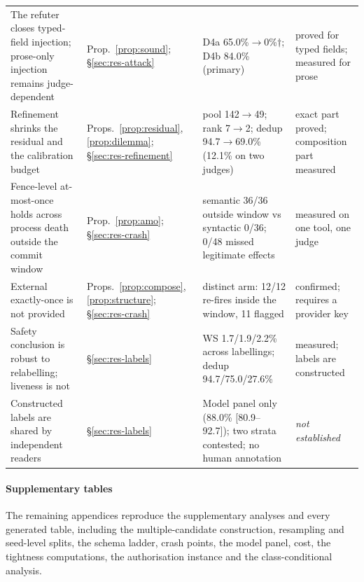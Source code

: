 \begin{table}[!tbp]
\begin{tabularx}{\linewidth}{@{}p{2.8cm}p{2.3cm}Xp{2.7cm}@{}}
The refuter closes typed-field injection; prose-only injection remains judge-dependent & Prop.~\ref{prop:sound}; §\ref{sec:res-attack} & D4a 65.0\%$\to$0\%$\dagger$; D4b 84.0\% (primary) & proved for typed fields; measured for prose \\
Refinement shrinks the residual and the calibration budget & Props.~\ref{prop:residual}, \ref{prop:dilemma}; §\ref{sec:res-refinement} & pool 142$\to$49; rank 7$\to$2; dedup 94.7$\to$69.0\% (12.1\% on two judges) & exact part proved; composition part measured \\
Fence-level at-most-once holds across process death outside the commit window & Prop.~\ref{prop:amo}; §\ref{sec:res-crash} & semantic 36/36 outside window vs syntactic 0/36; 0/48 missed legitimate effects & measured on one tool, one judge \\
External exactly-once is not provided & Props.~\ref{prop:compose}, \ref{prop:structure}; §\ref{sec:res-crash} & distinct arm: 12/12 re-fires inside the window, 11 flagged & confirmed; requires a provider key \\
Safety conclusion is robust to relabelling; liveness is not & §\ref{sec:res-labels} & WS 1.7/1.9/2.2\% across labellings; dedup 94.7/75.0/27.6\% & measured; labels are constructed \\
Constructed labels are shared by independent readers & §\ref{sec:res-labels} & Model panel only (88.0\% [80.9--92.7]); two strata contested; no human annotation & \emph{not established} \\
\bottomrule
\end{tabularx}
\end{table}


\paragraph{Supplementary tables}
The remaining appendices reproduce the supplementary analyses and every generated table, including the multiple-candidate construction, resampling and seed-level splits, the schema ladder, crash points, the model panel, cost, the tightness computations, the authorisation instance and the class-conditional analysis.
